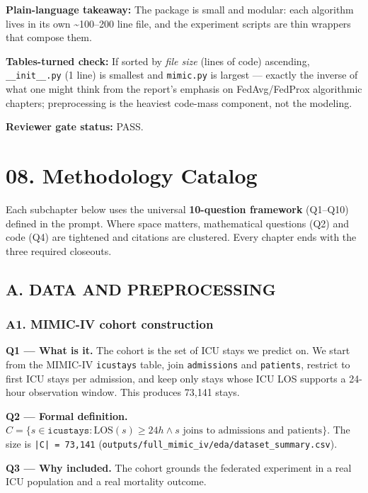 \documentclass{article}
\begin{document}
\textbf{Plain-language takeaway:} The package is small and modular: each algorithm lives in its own \textasciitilde{}100--200 line file, and the experiment scripts are thin wrappers that compose them.


\textbf{Tables-turned check:} If sorted by \emph{file size} (lines of code) ascending, \texttt{\_\_init\_\_.py} (1 line) is smallest and \texttt{mimic.py} is largest --- exactly the inverse of what one might think from the report's emphasis on FedAvg/FedProx algorithmic chapters; preprocessing is the heaviest code-mass component, not the modeling.


\textbf{Reviewer gate status:} PASS.



\clearpage
\section{08. Methodology Catalog}


Each subchapter below uses the universal \textbf{10-question framework} (Q1--Q10) defined in the prompt. Where space matters, mathematical questions (Q2) and code (Q4) are tightened and citations are clustered. Every chapter ends with the three required closeouts.


\subsection{A. DATA AND PREPROCESSING}


\subsubsection{A1. MIMIC-IV cohort construction}


\textbf{Q1 --- What is it.} The cohort is the set of ICU stays we predict on. We start from the MIMIC-IV \texttt{icustays} table, join \texttt{admissions} and \texttt{patients}, restrict to first ICU stays per admission, and keep only stays whose ICU LOS supports a 24-hour observation window. This produces 73,141 stays.


\textbf{Q2 --- Formal definition.} \(C = \{ s \in \texttt{icustays} : \text{LOS}(s) \ge 24h \land s \text{ joins to admissions and patients} \}\). The size is \texttt{|C| = 73,141} (\texttt{outputs/full\_mimic\_iv/eda/dataset\_summary.csv}).


\textbf{Q3 --- Why included.} The cohort grounds the federated experiment in a real ICU population and a real mortality outcome.
\end{document}
